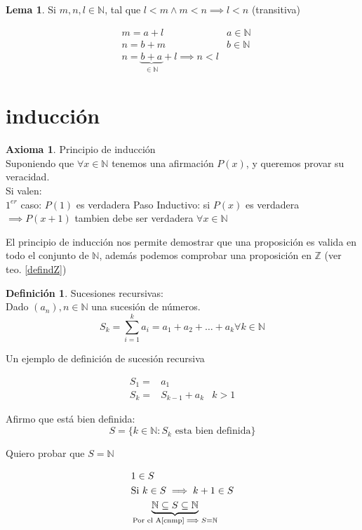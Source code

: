 \documentclass[9pt,a4paper]{article}
\theoremstyle{definition}
\newtheorem{defi}{Definición}
\newtheorem{axi}{Axioma}
\newtheorem{lema}{Lema}
\theoremstyle{plain}
\begin{document}
\begin{lema}
Si $m,n,l\in\mathbb{N}$, tal que $l<m\land m<n\implies l<n$ (transitiva)

\begin{align*}
& m = a+l   & a\in\mathbb{N} \\
& n = b+m   & b\in\mathbb{N} \\
& n = \underbrace{b+a}_{\in{\mathbb{N}}}+l \implies n<l
\end{align*}
\end{lema}

\section{inducción}

\begin{axi}\label{defindN} Principio de inducción\\
Suponiendo que $\forall x\in{\mathbb{N}}$ tenemos una afirmación $P(x)$, y queremos provar su veracidad.\\
Si valen:\\
$1^{er}$ caso: $P(1)$ es verdadera
Paso Inductivo: si $P(x)$ es verdadera $\implies P(x+1)$ tambien debe ser verdadera $\forall x\in{\mathbb{N}}$
\end{axi}

El principio de inducción nos permite demostrar que una proposición es valida en todo el conjunto de $\mathbb{N}$, además podemos comprobar una proposición en $\mathbb{Z}$ (ver teo. \ref{defindZ})

\begin{defi} Sucesiones recursivas:\\
Dado $(a_n), n\in\mathbb{N}$ una sucesión de números.\\
$$S_k = \sum_{i=1}^{k}a_i = a_1 + a_2 + \dots + a_k \forall k\in{\mathbb{N}}$$
\end{defi}

Un ejemplo de definición de sucesión recursiva

\begin{align*}
S_1 = & a_1 \\
S_k = & S_{k-1} + a_k & k>1
\end{align*}

Afirmo que está bien definida:\\

$$S=\{k\in{\mathbb{N}}: S_k \text{ esta bien definida}\}$$

Quiero probar que $S=\mathbb{N}$

\begin{align*}
& 1 \in S \\
& \text{Si } k\in{S}\implies k+1\in{S}\\
& \underbrace{\mathbb{N}\subseteq S \subseteq\mathbb{N}}_{\text{Por el A\ref{cnmp}}\implies S=\mathbb{N}}
\end{align*}
\end{document}
